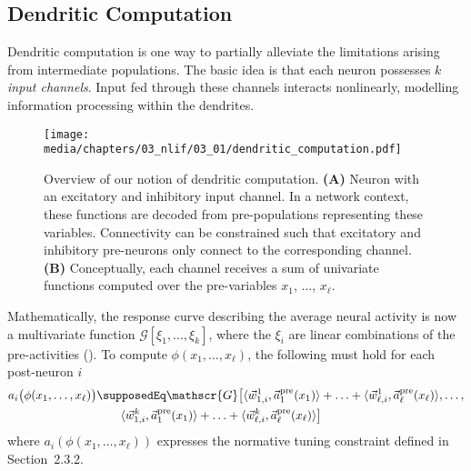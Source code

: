 \subsection{Dendritic Computation}
\label{sec:dendritic_computation_theory_dendritic}

Dendritic computation is one way to partially alleviate the limitations arising from intermediate populations.
The basic idea is that each neuron possesses $k$ \emph{input channels}.
Input fed through these channels interacts nonlinearly, modelling information processing within the dendrites.

\begin{figure}
	\texttt{[image: media/chapters/03\_nlif/03\_01/dendritic\_computation.pdf]}%
	{\label{fig:dendritic_computation_net}}%
	{\label{fig:dendritic_computation_fun}}%
	\caption[Overview of our notion of dendritic computation.]{Overview of our notion of dendritic computation. \textbf{(A)} Neuron with an excitatory and inhibitory input channel. In a network context, these functions are decoded from pre-populations representing these variables. Connectivity can be constrained such that excitatory and inhibitory pre-neurons only connect to the corresponding channel. \textbf{(B)} Conceptually, each channel receives a sum of univariate functions computed over the pre-variables $x_1$, $\ldots$, $x_\ell$.}
\end{figure}

Mathematically, the response curve describing the average neural activity is now a multivariate function $\mathscr{G}[\xi_1, \ldots, \xi_k]$, where the $\xi_i$ are linear combinations of the pre-activities ().
To compute $\phi(x_1, \ldots, x_\ell)$, the following must hold for each post-neuron $i$
\begin{align}
	\begin{aligned}
	a_i\bigl(\phi(x_1, \ldots, x_\ell)\bigr) &\supposedEq
	\mathscr{G} \bigl[
		\langle \vec w_{1, i}^1, \vec a^\mathrm{pre}_1(x_1) \rangle + \ldots +
		\langle \vec w_{\ell, i}^1, \vec a^\mathrm{pre}_\ell(x_\ell) \rangle, \ldots,\\
	&~\hspace{1.66em}
		\langle \vec w_{1, i}^k, \vec a^\mathrm{pre}_1(x_1) \rangle + \ldots +
		\langle \vec w_{\ell, i}^k, \vec a^\mathrm{pre}_\ell(x_\ell) \rangle
	\bigr]
	\end{aligned}
	\label{eqn:dendritic}
\end{align}
where $a_i(\phi(x_1, \ldots, x_\ell))$ expresses the normative tuning constraint defined in Section~2.3.2.

